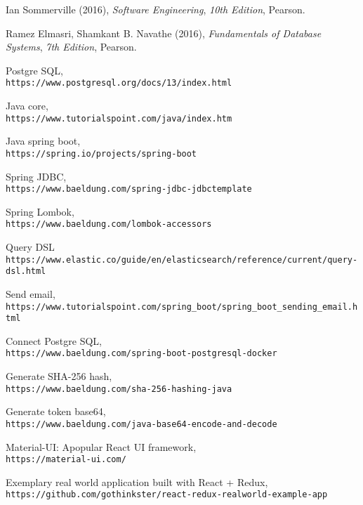 \documentclass[a4paper,12pt,fleqn,print,oneside]{extarticle}
\begin{document}
\begin{thebibliography}{80}

 Ian Sommerville (2016), \textit{Software Engineering}, \textit{10th Edition}, Pearson.

 Ramez Elmasri, Shamkant B. Navathe (2016), \textit{Fundamentals of Database Systems}, \textit{7th Edition}, Pearson.

 Postgre SQL, \\\texttt{https://www.postgresql.org/docs/13/index.html}

 Java core, \\\texttt{https://www.tutorialspoint.com/java/index.htm}

 Java spring boot, \\\texttt{https://spring.io/projects/spring-boot}

 Spring JDBC, \\\texttt{https://www.baeldung.com/spring-jdbc-jdbctemplate}

 Spring Lombok, \\\texttt{https://www.baeldung.com/lombok-accessors}

 Query DSL \\\texttt{https://www.elastic.co/guide/en/elasticsearch/reference/current/query-dsl.html}

 Send email, \\\texttt{https://www.tutorialspoint.com/spring\_boot/spring\_boot\_sending\_email.html}

 Connect Postgre SQL, \\\texttt{https://www.baeldung.com/spring-boot-postgresql-docker}

 Generate SHA-256 hash, \\\texttt{https://www.baeldung.com/sha-256-hashing-java}

 Generate token base64, \\\texttt{https://www.baeldung.com/java-base64-encode-and-decode}

 Material-UI: Apopular React UI framework, \\\texttt{https://material-ui.com/} 

 Exemplary real world application built with React + Redux, \\\texttt{https://github.com/gothinkster/react-redux-realworld-example-app}


\end{thebibliography}
\end{document}
